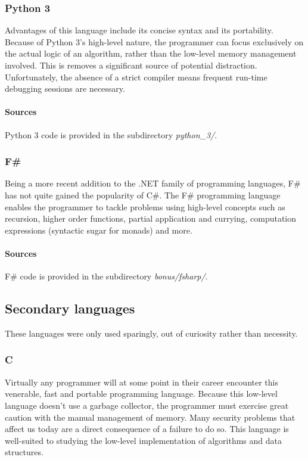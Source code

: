 \documentclass{article}
\begin{document}
\subsubsection{Python 3}
Advantages of this language include its concise syntax and its portability.
Because of Python 3's high-level nature, the programmer can focus exclusively on the actual logic of an algorithm,
rather than the low-level memory management involved. This is removes a significant source of potential distraction.
Unfortunately, the absence of a strict compiler means frequent run-time debugging sessions are necessary.

\paragraph{Sources}
Python 3 code is provided in the subdirectory {\em python\_3/}.

\subsubsection{F\#}
Being a more recent addition to the .NET family of programming languages,
F\# has not quite gained the popularity of C\#.
The F\# programming language enables the programmer to tackle problems
using high-level concepts such as recursion, higher order functions,
partial application and currying, computation expressions
(syntactic sugar for monads) and more.

\paragraph{Sources}
F\# code is provided in the subdirectory {\em bonus/fsharp/}.


\newpage


\subsection{Secondary languages}
These languages were only used sparingly, out of curiosity rather than necessity.

\subsubsection{C}
Virtually any programmer will at some point in their career encounter this venerable,
fast and portable programming language. Because this low-level language doesn't use a garbage collector,
the programmer must exercise great caution with the manual management of memory.
Many security problems that affect us today are a direct consequence of a failure to do so.
This language is well-suited to studying the low-level implementation of algorithms and data structures.
\end{document}
